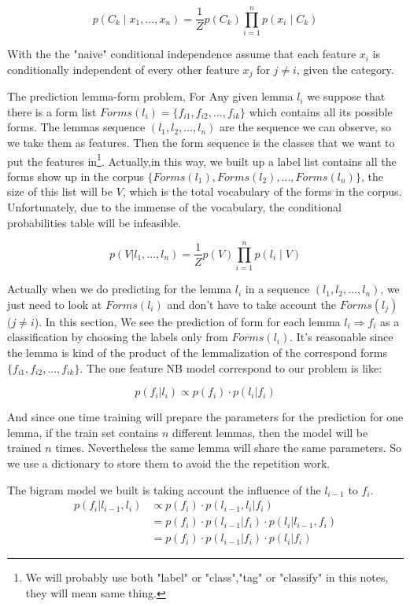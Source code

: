 \documentclass[a4paper]{article}
\begin{document}
\[p(C_{k}\mid x_{1},\dots ,x_{n})={\frac {1}{Z}}p(C_{k})\prod _{i=1}^{n}p(x_{i}\mid C_{k})\]

With the the "naive" conditional independence assume that each feature $x_{i}$ is conditionally independent of every other feature $x_{j}$ for $j \neq i$, given the category. 

The prediction lemma-form problem, For Any given lemma $l_i$ we suppose that there is a form list $Forms(l_i)=\{f_{i1},f_{i2},...,f_{ik}\}$ which contains all its possible forms. The lemmas sequence $(l_1,l_2,...,l_n)$ are the sequence we can observe, so we take them as features. Then the form sequence is the classes that we want to put the features in\footnote{We will probably use both "label" or "class","tag" or "classify" in this notes, they will mean same thing.}. Actually,in this way,  we built up a label list contains all the forms show up in the corpus $\{Forms(l_1),Forms(l_2),..., Forms(l_n)\}$, the size of this list will be $V$, which is the total vocabulary of the forms in the corpus. Unfortunately, due to the immense of the vocabulary, the conditional probabilities table will be infeasible.

\[p(V|l_1,...,l_n) = \frac{1}{Z} p(V) \prod _{i=1}^{n}p(l_i \mid V) \]

Actually when we do predicting for the lemma $l_i$ in a sequence $(l_1,l_2,...,l_n)$, we just need to look at $Forms(l_i)$ and don't have to take account the $Forms(l_j)$ ($j \neq i$). In this section, We see the prediction of form for each lemma $l_i  \Longrightarrow f_i$ as a classification by choosing the labels only from $Forms(l_i)$. It's reasonable since the lemma is kind of the product of the lemmalization of the correspond forms $\{f_{i1},f_{i2},...,f_{ik}\}$. The one feature NB model correspond to our problem is like:

\[p(f_i|l_i) \propto p(f_i) \cdot  p(l_i|f_i)\]


And since one time training will prepare the parameters for the prediction for one lemma, if the train set contains $n$ different lemmas, then the model will be trained $n$ times. Nevertheless the same lemma will share the same parameters. So we use a dictionary to store them to avoid the the repetition work.


The bigram model we built is taking account the influence of the $l_{i-1}$ to $f_i$.
\begin{align}
p(f_i|l_{i-1},l_i) &\propto p(f_i) \cdot  p(l_{i-1},l_i|f_i)  \\
&= p(f_i) \cdot  p(l_{i-1}|f_i) \cdot p( l_i | l_{i-1},f_i) \label{eq:bigram_mod} \\
&= p(f_i) \cdot  p(l_{i-1}|f_i) \cdot p( l_i | f_i) \label{eq:bigram_nb}
\end{align}
\end{document}
